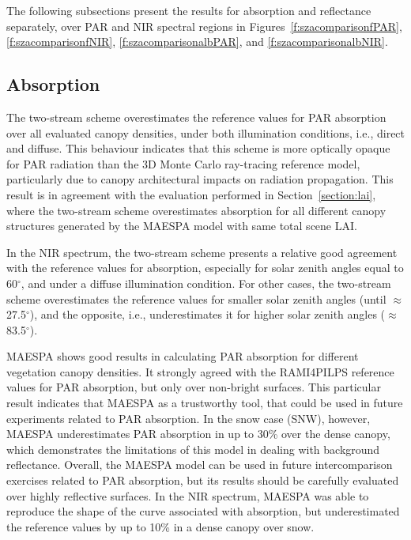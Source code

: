 The following subsections present the results for absorption and reflectance separately, over PAR and NIR spectral regions in Figures~\ref{f:szacomparisonfPAR}, \ref{f:szacomparisonfNIR}, \ref{f:szacomparisonalbPAR}, and \ref{f:szacomparisonalbNIR}.

\subsection{Absorption}

The two-stream scheme overestimates the reference values for PAR absorption over all evaluated canopy densities, under both illumination conditions, i.e., direct and diffuse. This behaviour indicates that this scheme is more optically opaque for PAR radiation than the 3D Monte Carlo ray-tracing reference model, particularly due to canopy architectural impacts on radiation propagation. This result is in agreement with the evaluation performed in Section~\ref{section:lai}, where the two-stream scheme overestimates absorption for all different canopy structures generated by the MAESPA model with same total scene LAI. 

In the NIR spectrum, the two-stream scheme presents a relative good agreement with the reference values for absorption, especially for solar zenith angles equal to 60$^{\circ}$, and under a diffuse illumination condition. For other cases, the two-stream scheme overestimates the reference values for smaller solar zenith angles (until $\approx$ 27.5$^{\circ}$), and the opposite, i.e., underestimates it for higher solar zenith angles ($\approx$ 83.5$^{\circ}$).

MAESPA shows good results in calculating PAR absorption for different vegetation canopy densities. It strongly agreed with the RAMI4PILPS reference values for PAR absorption, but only over non-bright surfaces. This particular result indicates that MAESPA as a trustworthy tool, that could be used in future experiments related to PAR absorption. In the snow case (SNW), however, MAESPA underestimates PAR absorption in up to 30\% over the dense canopy, which demonstrates the limitations of this model in dealing with background reflectance. Overall, the MAESPA model can be used in future intercomparison exercises related to PAR absorption, but its results should be carefully evaluated over highly reflective surfaces. In the NIR spectrum, MAESPA was able to reproduce the shape of the curve associated with absorption, but underestimated the reference values by up to 10\% in a dense canopy over snow.

